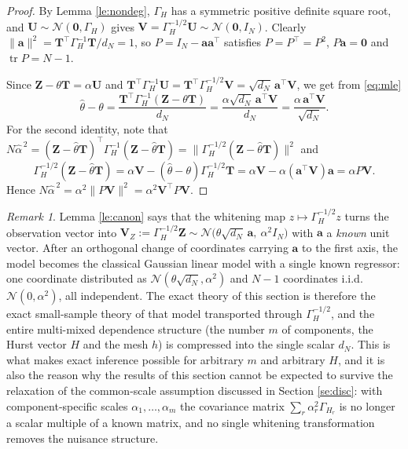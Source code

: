 \documentclass[11pt,reqno]{amsart}
\numberwithin{equation}{section}
\theoremstyle{plain}
\theoremstyle{definition}
\theoremstyle{remark}
\newtheorem{remark}[theorem]{Remark}
\newcommand{\bT}{\mathbf{T}}
\newcommand{\bZ}{\mathbf{Z}}
\newcommand{\bU}{\mathbf{U}}
\newcommand{\bV}{\mathbf{V}}
\newcommand{\ba}{\mathbf{a}}
\newcommand{\bze}{\mathbf{0}}
\newcommand{\GH}{\Gamma_H}
\newcommand{\Norm}{\mathcal{N}}
\DeclareMathOperator{\tr}{tr}
\begin{document}
\begin{proof}
By Lemma \ref{le:nondeg}, $\GH$ has a symmetric positive definite square root, and
$\bU\sim\Norm(\bze,\GH)$ gives $\bV=\GH^{-1/2}\bU\sim\Norm(\bze,I_N)$. Clearly
$\|\ba\|^{2}=\bT^{\top}\GH^{-1}\bT/d_N=1$, so $P=I_N-\ba\ba^{\top}$ satisfies
$P=P^{\top}=P^{2}$, $P\ba=\bze$ and $\tr P=N-1$.

Since $\bZ-\theta\bT=\alpha\bU$ and
$\bT^{\top}\GH^{-1}\bU=\bT^{\top}\GH^{-1/2}\bV=\sqrt{d_N}\,\ba^{\top}\bV$, we get from
\eqref{eq:mle}
\[
  \widehat\theta-\theta=\frac{\bT^{\top}\GH^{-1}(\bZ-\theta\bT)}{d_N}
  =\frac{\alpha\sqrt{d_N}\,\ba^{\top}\bV}{d_N}
  =\frac{\alpha\,\ba^{\top}\bV}{\sqrt{d_N}} .
\]
For the second identity, note that
$N\widehat\alpha^{\,2}=(\bZ-\widehat\theta\bT)^{\top}\GH^{-1}(\bZ-\widehat\theta\bT)
=\bigl\|\GH^{-1/2}(\bZ-\widehat\theta\bT)\bigr\|^{2}$ and
\[
  \GH^{-1/2}(\bZ-\widehat\theta\bT)=\alpha\bV-(\widehat\theta-\theta)\GH^{-1/2}\bT
  =\alpha\bV-\alpha(\ba^{\top}\bV)\ba=\alpha P\bV .
\]
Hence $N\widehat\alpha^{\,2}=\alpha^{2}\|P\bV\|^{2}=\alpha^{2}\bV^{\top}P\bV$.
\end{proof}

\begin{remark}\label{re:glm}
Lemma \ref{le:canon} says that the whitening map $z\mapsto\GH^{-1/2}z$ turns the
observation vector into
$\bV_{\!Z}:=\GH^{-1/2}\bZ\sim\Norm\bigl(\theta\sqrt{d_N}\,\ba,\ \alpha^{2}I_N\bigr)$
with $\ba$ a \emph{known} unit vector. After an orthogonal change of coordinates carrying
$\ba$ to the first axis, the model becomes the classical Gaussian linear model with a
single known regressor: one coordinate distributed as
$\Norm(\theta\sqrt{d_N},\alpha^{2})$ and $N-1$ coordinates i.i.d.\ $\Norm(0,\alpha^{2})$,
all independent. The exact theory of this section is therefore the exact small-sample
theory of that model transported through $\GH^{-1/2}$, and the entire multi-mixed
dependence structure (the number $m$ of components, the Hurst vector $H$ and the mesh
$h$) is compressed into the single scalar $d_N$. This is what makes exact inference
possible for arbitrary $m$ and arbitrary $H$, and it is also the reason why the results
of this section cannot be expected to survive the relaxation of the common-scale
assumption discussed in Section \ref{se:disc}: with component-specific scales
$\alpha_1,\dots,\alpha_m$ the covariance matrix
$\sum_r\alpha_r^{2}\Gamma_{H_r}$ is no longer a scalar multiple of a known matrix, and no
single whitening transformation removes the nuisance structure.
\end{remark}
\end{document}
